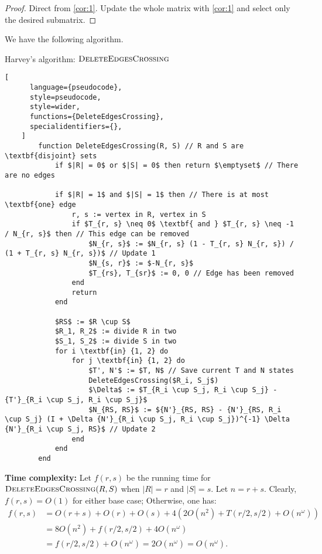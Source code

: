 \begin{proof}
    Direct from \ref{cor:1}. Update the whole matrix with \ref{cor:1} and select only the desired submatrix.
\end{proof}

We have the following algorithm.

\begin{programruledcaption}{Harvey's algorithm: \(\textsc{DeleteEdgesCrossing}\)}
    \begin{lstlisting}[
      language={pseudocode},
      style=pseudocode,
      style=wider,
      functions={DeleteEdgesCrossing},
      specialidentifiers={},
    ]
        function DeleteEdgesCrossing(R, S) // R and S are \textbf{disjoint} sets
            if $|R| = 0$ or $|S| = 0$ then return $\emptyset$ // There are no edges

            if $|R| = 1$ and $|S| = 1$ then // There is at most \textbf{one} edge
                r, s := vertex in R, vertex in S
                if $T_{r, s} \neq 0$ \textbf{ and } $T_{r, s} \neq -1 / N_{r, s}$ then // This edge can be removed
                    $N_{r, s}$ := $N_{r, s} (1 - T_{r, s} N_{r, s}) / (1 + T_{r, s} N_{r, s})$ // Update 1
                    $N_{s, r}$ := $-N_{r, s}$
                    $T_{rs}, T_{sr}$ := 0, 0 // Edge has been removed
                end
                return
            end

            $RS$ := $R \cup S$
            $R_1, R_2$ := divide R in two 
            $S_1, S_2$ := divide S in two
            for i \textbf{in} {1, 2} do
                for j \textbf{in} {1, 2} do
                    $T', N'$ := $T, N$ // Save current T and N states
                    DeleteEdgesCrossing($R_i, S_j$)
                    $\Delta$ := $T_{R_i \cup S_j, R_i \cup S_j} - {T'}_{R_i \cup S_j, R_i \cup S_j}$
                    $N_{RS, RS}$ := ${N'}_{RS, RS} - {N'}_{RS, R_i \cup S_j} (I + \Delta {N'}_{R_i \cup S_j, R_i \cup S_j})^{-1} \Delta {N'}_{R_i \cup S_j, RS}$ // Update 2
                end
            end
        end
    \end{lstlisting}
\end{programruledcaption}

\textbf{Time complexity:} Let \(f(r, s)\) be the running time for \(\textsc{DeleteEdgesCrossing}(R, S)\) when \(|R| = r\) and \(|S| = s\).
Let \(n = r + s\). Clearly, \(f(r, s) = O(1)\) for either base case;
Otherwise, one has:
\begin{align}
    f(r, s) &= O(r + s) + O(r) + O(s) + 4(2O(n^2) + T(r / 2, s / 2) + O(n^\omega))  \\
    &= 8O(n^2) + f(r / 2, s / 2) + 4O(n^\omega) \\
    &= f(r / 2, s / 2) + O(n^\omega) = 2O(n^\omega) = O(n^\omega). \label{alg:delcrossing}
\end{align}


